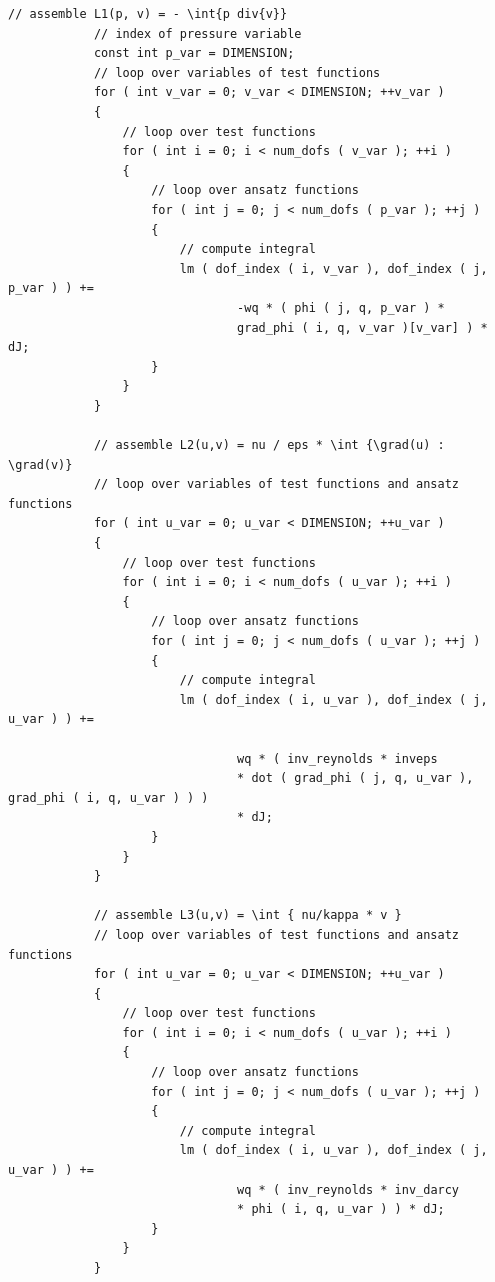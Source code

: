 \documentclass{article}
\begin{document}
\begin{lstlisting}[firstnumber=264]
            // assemble L1(p, v) = - \int{p div{v}}
            // index of pressure variable
            const int p_var = DIMENSION;
            // loop over variables of test functions
            for ( int v_var = 0; v_var < DIMENSION; ++v_var )
            {
                // loop over test functions
                for ( int i = 0; i < num_dofs ( v_var ); ++i )
                {
                    // loop over ansatz functions
                    for ( int j = 0; j < num_dofs ( p_var ); ++j )
                    {
                        // compute integral
                        lm ( dof_index ( i, v_var ), dof_index ( j, p_var ) ) +=
                                -wq * ( phi ( j, q, p_var ) *
                                grad_phi ( i, q, v_var )[v_var] ) * dJ;
                    }
                }
            }

            // assemble L2(u,v) = nu / eps * \int {\grad(u) : \grad(v)}
            // loop over variables of test functions and ansatz functions
            for ( int u_var = 0; u_var < DIMENSION; ++u_var )
            {
                // loop over test functions
                for ( int i = 0; i < num_dofs ( u_var ); ++i )
                {
                    // loop over ansatz functions
                    for ( int j = 0; j < num_dofs ( u_var ); ++j )
                    {
                        // compute integral
                        lm ( dof_index ( i, u_var ), dof_index ( j, u_var ) ) +=

                                wq * ( inv_reynolds * inveps
                                * dot ( grad_phi ( j, q, u_var ), grad_phi ( i, q, u_var ) ) )
                                * dJ;
                    }
                }
            }

            // assemble L3(u,v) = \int { nu/kappa * v }
            // loop over variables of test functions and ansatz functions
            for ( int u_var = 0; u_var < DIMENSION; ++u_var )
            {
                // loop over test functions
                for ( int i = 0; i < num_dofs ( u_var ); ++i )
                {
                    // loop over ansatz functions
                    for ( int j = 0; j < num_dofs ( u_var ); ++j )
                    {
                        // compute integral
                        lm ( dof_index ( i, u_var ), dof_index ( j, u_var ) ) +=
                                wq * ( inv_reynolds * inv_darcy
                                * phi ( i, q, u_var ) ) * dJ;
                    }
                }
            }


\end{lstlisting}
\end{document}

